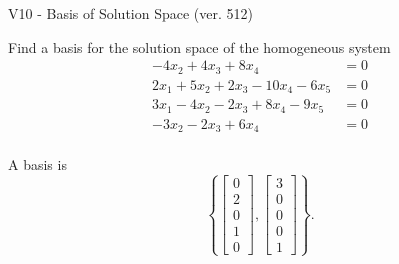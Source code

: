 \begin{exercise}
  \begin{exerciseTitle}V10 - Basis of Solution Space (ver. 512)\end{exerciseTitle}
  \begin{exerciseStatement}
    Find a basis for the solution space of the homogeneous system 
\begin{align*}
 -4 x_ 2 + 4 x_ 3 + 8 x_ 4 &= 0  \\ 
  2 x_ 1 + 5 x_ 2 + 2 x_ 3 -10 x_ 4 -6 x_ 5 &= 0  \\ 
  3 x_ 1 -4 x_ 2 -2 x_ 3 + 8 x_ 4 -9 x_ 5 &= 0  \\ 
  -3 x_ 2 -2 x_ 3 + 6 x_ 4 &= 0  \\ 
 \end{align*}


 
  \end{exerciseStatement}

  \begin{exerciseAnswer}
   A basis is   
\[\left\{\left[\begin{array}{c}
0 \\
2 \\
0 \\
1 \\
0
\end{array}\right] , \left[\begin{array}{c}
3 \\
0 \\
0 \\
0 \\
1
\end{array}\right]\right\}.\]

  


  \end{exerciseAnswer}
\end{exercise}